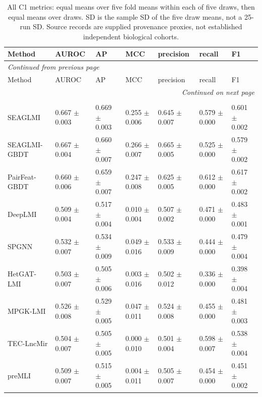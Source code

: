 \begin{landscape}
{\scriptsize
\setlength{\tabcolsep}{4pt}
\renewcommand{\arraystretch}{1.08}
\begin{longtable}{lllllll}
\caption{All C1 metrics: equal means over five fold means within each of five draws, then equal means over draws. SD is the sample SD of the five draw means, not a 25-run SD. Source records are supplied provenance proxies, not established independent biological cohorts.}\label{tab:screened-C1-full}\\
\toprule
Method & AUROC & AP & MCC & precision & recall & F1 \\
\midrule
\endfirsthead
\multicolumn{7}{l}{\textit{Continued from previous page}}\\
\toprule
Method & AUROC & AP & MCC & precision & recall & F1 \\
\midrule
\endhead
\midrule
\multicolumn{7}{r}{\textit{Continued on next page}}\\
\endfoot
\bottomrule
\endlastfoot
\multicolumn{7}{l}{\textit{Strict | source-record proxy | outer 1:1}}\\
SEAGLMI & 0.667 $\pm$ 0.003 & 0.669 $\pm$ 0.003 & 0.255 $\pm$ 0.006 & 0.645 $\pm$ 0.007 & 0.579 $\pm$ 0.000 & 0.601 $\pm$ 0.002 \\
SEAGLMI-GBDT & 0.667 $\pm$ 0.004 & 0.660 $\pm$ 0.007 & 0.266 $\pm$ 0.007 & 0.665 $\pm$ 0.005 & 0.525 $\pm$ 0.000 & 0.579 $\pm$ 0.002 \\
PairFeat-GBDT & 0.660 $\pm$ 0.006 & 0.659 $\pm$ 0.007 & 0.247 $\pm$ 0.008 & 0.625 $\pm$ 0.005 & 0.612 $\pm$ 0.000 & 0.617 $\pm$ 0.002 \\
DeepLMI & 0.509 $\pm$ 0.004 & 0.517 $\pm$ 0.004 & 0.010 $\pm$ 0.004 & 0.507 $\pm$ 0.002 & 0.471 $\pm$ 0.000 & 0.483 $\pm$ 0.001 \\
SPGNN & 0.532 $\pm$ 0.007 & 0.534 $\pm$ 0.009 & 0.049 $\pm$ 0.016 & 0.533 $\pm$ 0.009 & 0.444 $\pm$ 0.000 & 0.479 $\pm$ 0.004 \\
HetGAT-LMI & 0.503 $\pm$ 0.007 & 0.505 $\pm$ 0.006 & 0.003 $\pm$ 0.016 & 0.502 $\pm$ 0.012 & 0.336 $\pm$ 0.000 & 0.398 $\pm$ 0.004 \\
MPGK-LMI & 0.526 $\pm$ 0.008 & 0.529 $\pm$ 0.005 & 0.047 $\pm$ 0.011 & 0.524 $\pm$ 0.008 & 0.455 $\pm$ 0.000 & 0.481 $\pm$ 0.003 \\
TEC-LncMir & 0.504 $\pm$ 0.007 & 0.505 $\pm$ 0.005 & 0.000 $\pm$ 0.010 & 0.501 $\pm$ 0.004 & 0.598 $\pm$ 0.007 & 0.538 $\pm$ 0.004 \\
preMLI & 0.509 $\pm$ 0.007 & 0.515 $\pm$ 0.005 & 0.004 $\pm$ 0.011 & 0.505 $\pm$ 0.007 & 0.454 $\pm$ 0.000 & 0.451 $\pm$ 0.002 \\

\end{longtable}}
\end{landscape}
